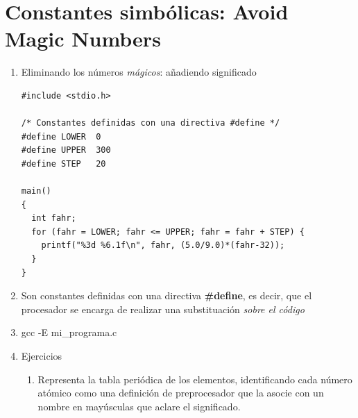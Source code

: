 \documentclass[a4paper,oneside]{article}
\begin{document}
\section{Constantes simbólicas: Avoid Magic Numbers}
  \begin{enumerate}
  \item{Eliminando los números \textit{mágicos}: añadiendo significado}

    \begin{verbatim}
#include <stdio.h>

/* Constantes definidas con una directiva #define */
#define LOWER  0
#define UPPER  300
#define STEP   20

main()
{
  int fahr;
  for (fahr = LOWER; fahr <= UPPER; fahr = fahr + STEP) {
    printf("%3d %6.1f\n", fahr, (5.0/9.0)*(fahr-32));
  }
}
    \end{verbatim}
  \item{Son constantes definidas con una directiva \textbf{\#define}, es decir, que el procesador se encarga de realizar una substituación \textit{sobre el código}}
  \item{gcc -E mi\_programa.c}
  \item{Ejercicios}
    \begin{enumerate}
    \item Representa la tabla periódica de los elementos, identificando cada número atómico como una definición de preprocesador que la asocie con un nombre en mayúsculas que aclare el significado.
    \end{enumerate}
  \end{enumerate}
\end{document}
